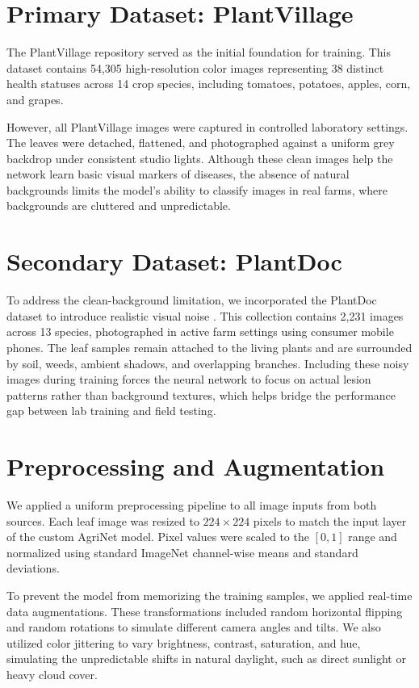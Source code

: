 \documentclass[12pt, a4paper]{report}
\begin{document}
\section{Primary Dataset: PlantVillage}
The PlantVillage repository \cite{plantvillage} served as the initial foundation for training. This dataset contains 54,305 high-resolution color images representing 38 distinct health statuses across 14 crop species, including tomatoes, potatoes, apples, corn, and grapes. 

However, all PlantVillage images were captured in controlled laboratory settings. The leaves were detached, flattened, and photographed against a uniform grey backdrop under consistent studio lights. Although these clean images help the network learn basic visual markers of diseases, the absence of natural backgrounds limits the model's ability to classify images in real farms, where backgrounds are cluttered and unpredictable.

\section{Secondary Dataset: PlantDoc}
To address the clean-background limitation, we incorporated the PlantDoc dataset to introduce realistic visual noise \cite{plantdoc}. This collection contains 2,231 images across 13 species, photographed in active farm settings using consumer mobile phones. The leaf samples remain attached to the living plants and are surrounded by soil, weeds, ambient shadows, and overlapping branches. Including these noisy images during training forces the neural network to focus on actual lesion patterns rather than background textures, which helps bridge the performance gap between lab training and field testing.

\section{Preprocessing and Augmentation}
We applied a uniform preprocessing pipeline to all image inputs from both sources. Each leaf image was resized to $224 \times 224$ pixels to match the input layer of the custom AgriNet model. Pixel values were scaled to the $[0, 1]$ range and normalized using standard ImageNet channel-wise means and standard deviations.

To prevent the model from memorizing the training samples, we applied real-time data augmentations. These transformations included random horizontal flipping and random rotations to simulate different camera angles and tilts. We also utilized color jittering to vary brightness, contrast, saturation, and hue, simulating the unpredictable shifts in natural daylight, such as direct sunlight or heavy cloud cover.
\end{document}
